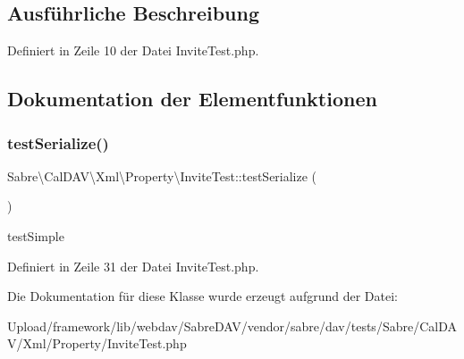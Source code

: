 \subsection{Ausführliche Beschreibung}


Definiert in Zeile 10 der Datei Invite\+Test.\+php.



\subsection{Dokumentation der Elementfunktionen}
\mbox{\label{class_sabre_1_1_cal_d_a_v_1_1_xml_1_1_property_1_1_invite_test_a47dac3a40c3d5b74443f77b6a24da947}} 
\subsubsection{\texorpdfstring{test\+Serialize()}{testSerialize()}}
{\footnotesize\ttfamily Sabre\textbackslash{}\+Cal\+D\+A\+V\textbackslash{}\+Xml\textbackslash{}\+Property\textbackslash{}\+Invite\+Test\+::test\+Serialize (\begin{DoxyParamCaption}{ }\end{DoxyParamCaption})}

test\+Simple 

Definiert in Zeile 31 der Datei Invite\+Test.\+php.



Die Dokumentation für diese Klasse wurde erzeugt aufgrund der Datei\+:\begin{DoxyCompactItemize}
\item 
Upload/framework/lib/webdav/\+Sabre\+D\+A\+V/vendor/sabre/dav/tests/\+Sabre/\+Cal\+D\+A\+V/\+Xml/\+Property/Invite\+Test.\+php\end{DoxyCompactItemize}
